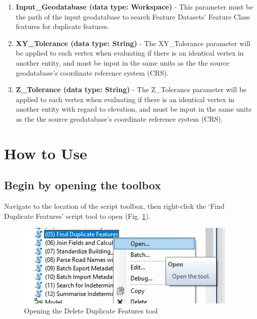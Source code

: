\documentclass[openany]{book}
\providecommand{\tightlist}{%
  \setlength{\itemsep}{0pt}\setlength{\parskip}{0pt}}
\theoremstyle{definition}
\theoremstyle{definition}
\theoremstyle{definition}
\theoremstyle{remark}
\begin{document}
\begin{enumerate}
\def\labelenumi{\arabic{enumi}.}
\tightlist
\item
  \textbf{Input\_Geodatabase (data type: Workspace)} - This parameter
  must be the path of the input geodatabase to search Feature Datasets'
  Feature Class features for duplicate features.
\item
  \textbf{XY\_Tolerance (data type: String)} - The XY\_Tolerance
  parameter will be applied to each vertex when evaluating if there is
  an identical vertex in another entity, and must be input in the same
  units as the the source geodatabase's coordinate reference system
  (CRS).
\item
  \textbf{Z\_Tolerance (data type: String)} - The Z\_Tolerance parameter
  will be applied to each vertex when evaluating if there is an
  identical vertex in another entity with regard to elevation, and must
  be input in the same units as the the source geodatabase's coordinate
  reference system (CRS).
\end{enumerate}

\section{How to Use}\label{how-to-use-4}

\subsection{Begin by opening the
toolbox}\label{begin-by-opening-the-toolbox-4}

Navigate to the location of the script toolbox, then right-click the
`Find Duplicate Features' script tool to open (Fig. \ref{fig:delFopen}).

\begin{figure}[H]

{\centering \includegraphics{figures/delF-opentool} 

}

\caption{Opening the Delete Duplicate Features tool}\label{fig:delFopen}
\end{figure}
\end{document}
